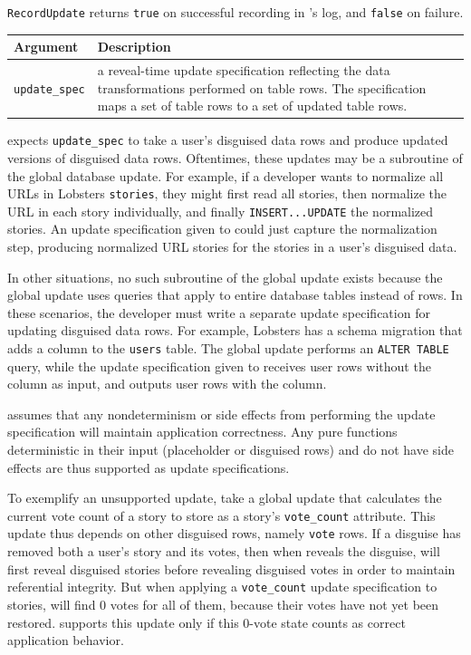 \texttt{RecordUpdate} returns \texttt{true} on successful recording in \sys's
    log, and \texttt{false} on failure.

\begin{center}
    \begin{longtable}{|m{}|m{}|}
        \hline
        \textbf{Argument} & \textbf{Description} \\
        \hline
             \texttt{update\_spec}& a reveal-time update specification reflecting
    the data transformations performed on table rows. The specification maps a
    set of table rows to a set of updated table rows.\\
        \hline
    \end{longtable}
    \end{center}

%
    \sys expects \texttt{update\_spec} to take a user's disguised data rows and
    produce updated versions of disguised data rows.
%
    Oftentimes, these updates may be a subroutine of the global database update. 
%
    For example, if a developer wants to normalize all URLs in Lobsters
    \texttt{stories}, they might first read all stories, then normalize the URL
    in each story individually, and finally \texttt{INSERT...UPDATE} the
    normalized stories. 
%
    An update specification given to \sys could just capture the normalization
    step, producing normalized URL stories for the stories in a user's disguised
    data.
%

%
    In other situations, no such subroutine of the global update exists because
    the global update uses queries that apply to entire database tables instead
    of rows.  In these scenarios, the developer must write a separate update
    specification for updating disguised data rows.
%
    For example, Lobsters has a schema migration that adds a column to the
    \texttt{users} table.  The global update performs an \texttt{ALTER TABLE}
    query, while the update specification given to \sys receives user rows
    without the column as input, and outputs user rows with the column.
%

%
    \sys assumes that any nondeterminism or side effects from performing the
    update specification will maintain application correctness. Any pure
    functions deterministic in their input (placeholder or disguised rows) and
    do not have side effects are thus supported as update specifications.
%

%
    To exemplify an unsupported update, take a global update that calculates the
    current vote count of a story to store as a story's \texttt{vote\_count}
    attribute. 
%
    This update thus depends on other disguised rows, namely \texttt{vote} rows.
%
    If a disguise has removed both a user's story and its votes, then when \sys
    reveals the disguise, \sys will first reveal disguised stories before
    revealing disguised votes in order to maintain referential integrity. 
%
    But when applying a \texttt{vote\_count} update specification to stories,
    \sys will find 0 votes for all of them, because their votes have not yet
    been restored.
%
    \sys supports this update only if this 0-vote state counts as correct
    application behavior.
%

